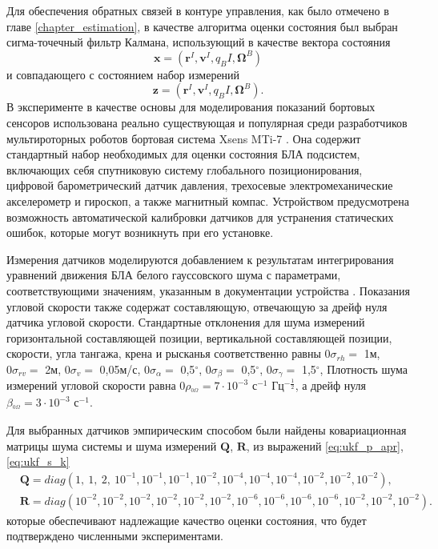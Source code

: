 Для обеспечения обратных связей в контуре управления, как было отмечено в главе \ref{chapter_estimation}, в качестве алгоритма оценки состояния был выбран сигма-точечный фильтр Калмана, использующий в качестве вектора состояния
\begin{equation}
\bm x = (\bm r^I, \bm v^I, q_BI, \bm \Omega^B)
\end{equation}
и совпадающего с состоянием набор измерений
\begin{equation}
\bm z = (\bm r^I, \bm v^I, q_BI, \bm \Omega^B).
\end{equation}
В эксперименте в качестве основы для моделирования показаний бортовых сенсоров использована реально существующая и популярная среди разработчиков мультироторных роботов бортовая система Xsens MTi-7 \cite{xsens01}.
Она содержит стандартный набор необходимых для оценки состояния БЛА подсистем, включающих себя спутниковую систему глобального позиционирования, цифровой барометрический датчик давления, трехосевые электромеханические акселерометр и гироскоп, а также магнитный компас.
Устройством предусмотрена возможность автоматической калибровки датчиков для устранения статических ошибок, которые могут возникнуть при его установке.

Измерения датчиков моделируются добавлением к результатам интегрирования уравнений движения БЛА белого гауссовского шума с параметрами, соответствующими значениям, указанным в документации устройства \cite{xsens01}.
Показания угловой скорости также содержат составляющую, отвечающую за дрейф нуля датчика угловой скорости.
Стандартные отклонения для шума измерений горизонтальной составляющей позиции, вертикальной составляющей позиции, скорости, угла тангажа, крена и рысканья соответственно равны
${{0{\sigma }}_{rh}}=$ 1м,
${{0{\sigma }}_{rv}} = $ 2м,
${{0{\sigma }}_{v}} = $ 0,05м/с,
${{0{\sigma }}_{\alpha}} = $ 0,5$^\circ$,
${{0{\sigma }}_{\beta}} = $ 0,5$^\circ$,
${{0{\sigma }}_{\gamma}} = $ 1,5$^\circ$,
Плотность шума измерений угловой скорости равна  
${{0{\rho }}_{^{0{\Omega }}}} = 7\cdot{10^{-3}}$ с$^{-1}$ Гц$^{-\frac{1}{2}}$,
а дрейф нуля
${{\beta }}_{^{0{\Omega }}} = 3\cdot{10^{-3}}$ с$^{-1}$.

Для выбранных датчиков эмпирическим способом были найдены
ковариационная матрицы шума системы и шума измерений
$\bm Q$,
$\bm R$,
из выражений \eqref{eq:ukf_p_apr}, \eqref{eq:ukf_s_k}
\small
\begin{equation}
\begin{aligned}
&\bm Q = diag(1,\ 1,\ 2,\ {10^{-1}}, {10^{-1}}, {10^{-1}}, {10^{-2}}, {10^{-4}}, {10^{-4}}, {10^{-4}}, {10^{-2}}, {10^{-2}}, {10^{-2}}),
\\
&\bm R = diag({10^{-2}}, {10^{-2}}, {10^{-2}}, {10^{-2}}, {10^{-2}}, {10^{-2}}, {10^{-6}}, {10^{-6}}, {10^{-6}}, {10^{-6}}, {10^{-2}}, {10^{-2}}, {10^{-2}}).
\end{aligned}
\end{equation}
\normalsize
которые обеспечивают надлежащие качество оценки состояния, что будет подтверждено численными экспериментами.

